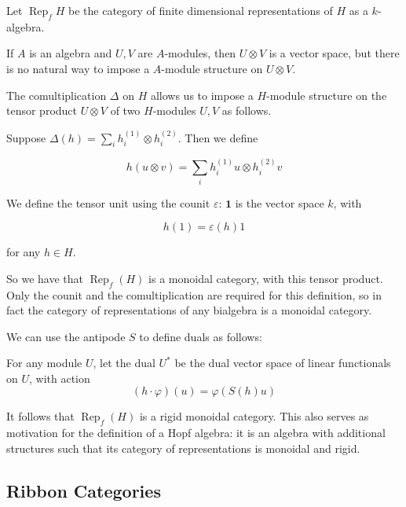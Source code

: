 \documentclass[]{article}
\newcommand{\Rep}{\operatorname{Rep}}
\numberwithin{equation}{subsection}
\begin{document}
Let $\Rep_f H$ be the category of finite dimensional representations of $H$ as a $k$-algebra.

If $A$ is an algebra and $U, V$ are $A$-modules, then $U \otimes V$ is a vector
space, but there is no natural way to impose a $A$-module structure on $U
\otimes V$. 

The comultiplication $\Delta$ on $H$ allows us to impose a $H$-module structure
on the tensor product $U \otimes V$ of two $H$-modules $U,V$ as follows.

Suppose $\Delta(h) = \sum _{i} h^{(1)}_i \otimes h^{(2)}_i$. Then we define

\begin{equation}
    h (u \otimes v) = \sum_{i} h^{(1)}_i u \otimes h^{(2)}_i v
\end{equation}

We define the tensor unit using the counit $\varepsilon$: $\mathbf{1}$ is the vector space $k$, with 

\begin{equation}
    h(1) = \varepsilon(h) 1
\end{equation}

 for any $h\in H$.

So we have that $\Rep_f(H)$ is a monoidal category, with this tensor product.
Only the counit and the comultiplication are required for this definition, so
in fact the category of representations of any bialgebra is a monoidal
category.

We can use the antipode $S$ to define duals as follows:

For any module $U$, let the dual $U^*$ be the dual vector space of linear functionals on $U$, with action
\begin{equation}
    (h\cdot \varphi)(u)  = \varphi(S(h) u)
\end{equation}

It follows that $\Rep_f(H)$ is a rigid monoidal category. This also serves as
motivation for the definition of a Hopf algebra: it is an algebra with
additional structures such that its category of representations is monoidal and
rigid. 





\subsection{Ribbon Categories}
\end{document}
